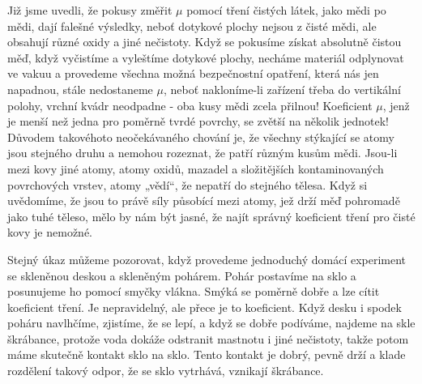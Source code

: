     Již jsme uvedli, že pokusy změřit \(\mu\) pomocí tření čistých látek, jako mědi po mědi, dají 
    falešné výsledky, neboť dotykové plochy nejsou z čisté mědi, ale obsahují různé oxidy a jiné 
    nečistoty. Když se pokusíme získat absolutně čistou měď, když vyčistíme a vyleštíme dotykové 
    plochy, necháme materiál odplynovat ve vakuu a provedeme všechna možná bezpečnostní opatření, 
    která nás jen napadnou, stále nedostaneme \(\mu\), neboť nakloníme-li zařízení třeba do 
    vertikální polohy, vrchní kvádr neodpadne - oba kusy mědi zcela přilnou! Koeficient \(\mu\), 
    jenž je menší než jedna pro poměrně tvrdé povrchy, se zvětší na několik jednotek! Důvodem 
    takovéhoto neočekávaného chování je, že všechny stýkající se atomy jsou stejného druhu a 
    nemohou rozeznat, že patří různým kusům mědi. Jsou-li mezi kovy jiné atomy, atomy oxidů, 
    mazadel a složitějších kontaminovaných povrchových vrstev, atomy „vědí“, že nepatří do stejného 
    tělesa. Když si uvědomíme, že jsou to právě síly působící mezi atomy, jež drží měď pohromadě 
    jako tuhé těleso, mělo by nám být jasné, že najít správný koeficient tření pro čisté kovy je 
    nemožné.
    
    Stejný úkaz můžeme pozorovat, když provedeme jednoduchý domácí experiment se skleněnou deskou a 
    skleněným pohárem. Pohár postavíme na sklo a posunujeme ho pomocí smyčky vlákna. Smýká se 
    poměrně dobře a lze cítit koeficient tření. Je nepravidelný, ale přece je to koeficient. Když 
    desku i spodek poháru navlhčíme, zjistíme, že se lepí, a když se dobře podíváme, najdeme na 
    skle škrábance, protože voda dokáže odstranit mastnotu i jiné nečistoty, takže potom máme 
    skutečně kontakt sklo na sklo. Tento kontakt je dobrý, pevně drží a klade rozdělení takový 
    odpor, že se sklo vytrhává, vznikají škrábance.
    
    
